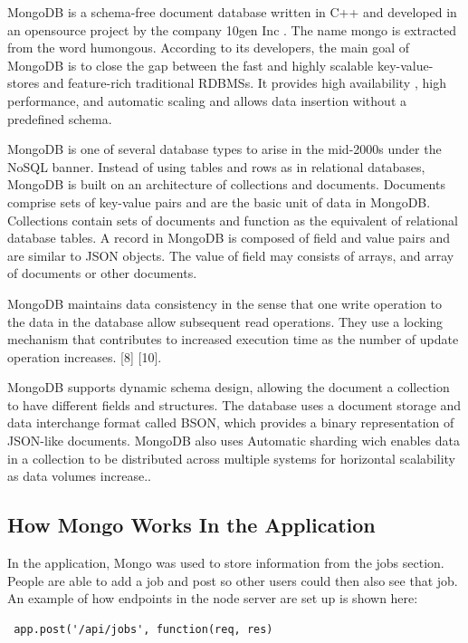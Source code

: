 MongoDB is a schema-free document database written in C++ and developed in an opensource project by the company 10gen Inc \cite{mongoname}. The name mongo is extracted from the word humongous. According to its developers, the main
goal of MongoDB is to close the gap between the fast and highly scalable key-value-stores and feature-rich traditional RDBMSs.
It provides high availability , high performance, and automatic scaling
and allows data insertion without a predefined schema. 

MongoDB is one of several database types to arise in the mid-2000s under the NoSQL banner. Instead of using tables and rows as in relational databases, MongoDB is built on an architecture of collections and documents. Documents comprise sets of key-value pairs and are the basic unit of data in MongoDB. Collections contain sets of documents and function as the equivalent of relational database tables. 
A record in MongoDB is composed of field and value pairs and are similar to
JSON objects. The value of field may consists of arrays, and array of documents
or other documents.

MongoDB maintains data consistency in the
sense that one write operation to the data in the database allow subsequent
read operations. They use a locking mechanism that contributes to increased
execution time as the number of update operation increases. [8] [10].

MongoDB supports dynamic schema design, allowing the document a collection to have different fields and structures. The database uses a document storage and data interchange format called BSON, which provides a binary representation of JSON-like documents. MongoDB also uses Automatic sharding wich enables data in a collection to be distributed across multiple systems for horizontal scalability as data volumes increase.\cite{MongoDB}.


\subsection{How Mongo Works In the Application}
In the application, Mongo was used to store information from the jobs section. People are able to add a job and post so other users could then also see that job. An example of how endpoints in the node server are set up is shown here:

\begin{verbatim}
 app.post('/api/jobs', function(req, res)
\end{verbatim}

